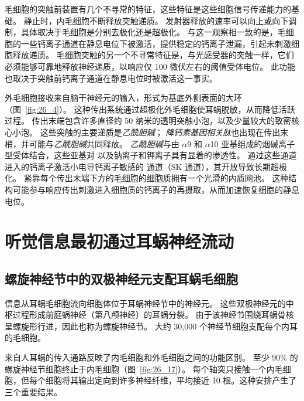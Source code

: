 毛细胞的突触前装置有几个不寻常的特征，这些特征是这些细胞信号传递能力的基础。
静止时，内毛细胞不断释放突触递质。
发射器释放的速率可以向上或向下调制，具体取决于毛细胞是分别去极化还是超极化。
与这一观察相一致的是，毛细胞的一些钙离子通道在静息电位下被激活，提供稳定的钙离子泄漏，引起未刺激细胞释放递质。
毛细胞突触的另一个不寻常特征是，与光感受器的突触一样，它们必须能够可靠地释放神经递质，以响应仅 100 微伏左右的阈值受体电位。
此功能也取决于突触前钙离子通道在静息电位时被激活这一事实。


外毛细胞接收来自脑干神经元的输入，形式为基底外侧表面的大环（图~\ref{fig:26_4}）。
这种传出系统通过超极化外毛细胞使耳蜗脱敏，从而降低活跃过程。
传出末端包含许多直径约 50 纳米的透明突触小泡，以及少量较大的致密核心小泡。
这些突触的主要递质是\textit{乙酰胆碱}；
\textit{降钙素基因相关肽}也出现在传出末梢，并可能与\textit{乙酰胆碱}共同释放。
\textit{乙酰胆碱}与由 $\alpha$9 和 $\alpha$10 亚基组成的烟碱离子型受体结合，这些亚基对  以及钠离子和钾离子具有显着的渗透性。
通过这些通道进入的钙离子激活小电导钙离子敏感的  通道（SK 通道），其开放导致长期超极化。
紧靠每个传出末端下方的毛细胞的细胞质拥有一个光滑的内质网池。
这种结构可能参与响应传出刺激进入细胞质的钙离子的再摄取，从而加速恢复细胞的静息电位。



\section{听觉信息最初通过耳蜗神经流动}

\subsection{螺旋神经节中的双极神经元支配耳蜗毛细胞}

信息从耳蜗毛细胞流向细胞体位于耳蜗神经节中的神经元。
这些双极神经元的中枢过程形成前庭蜗神经（第八颅神经）的耳蜗分裂。
由于该神经节围绕耳蜗骨核呈螺旋形行进，因此也称为螺旋神经节。
大约 30,000 个神经节细胞支配每个内耳的毛细胞。


来自人耳蜗的传入通路反映了内毛细胞和外毛细胞之间的功能区别。
至少 90\% 的螺旋神经节细胞终止于内毛细胞（图~\ref{fig:26_17}）。
每个轴突只接触一个内毛细胞，但每个细胞将其输出定向到许多神经纤维，平均接近 10 根。这种安排产生了三个重要结果。


